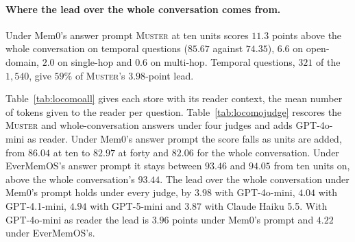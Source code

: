 \documentclass{article}
\newcommand{\sys}{\textsc{Muster}}
\begin{document}
\paragraph{Where the lead over the whole conversation comes from.} Under Mem0's answer prompt \sys{} at ten units scores $11.3$ points above the whole conversation on temporal questions ($85.67$ against $74.35$), $6.6$ on open-domain, $2.0$ on single-hop and $0.6$ on multi-hop. Temporal questions, $321$ of the $1{,}540$, give $59\%$ of \sys{}'s $3.98$-point lead.

Table~\ref{tab:locomoall} gives each store with its reader context, the mean number of tokens given to the reader per question. Table~\ref{tab:locomojudge} rescores the \sys{} and whole-conversation answers under four judges and adds GPT-4o-mini as reader. Under Mem0's answer prompt the score falls as units are added, from $86.04$ at ten to $82.97$ at forty and $82.06$ for the whole conversation. Under EverMemOS's answer prompt it stays between $93.46$ and $94.05$ from ten units on, above the whole conversation's $93.44$. The lead over the whole conversation under Mem0's prompt holds under every judge, by $3.98$ with GPT-4o-mini, $4.04$ with GPT-4.1-mini, $4.94$ with GPT-5-mini and $3.87$ with Claude Haiku 5.5. With GPT-4o-mini as reader the lead is $3.96$ points under Mem0's prompt and $4.22$ under EverMemOS's.
\end{document}
